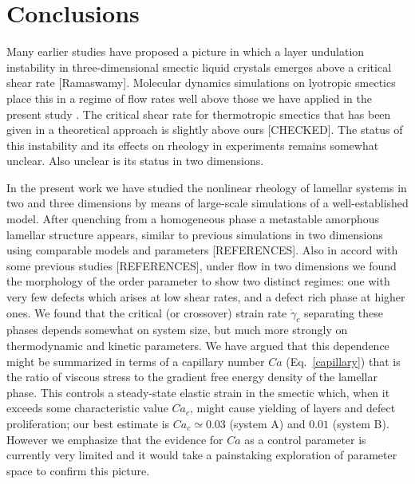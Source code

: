 \documentclass[8.5pt,twoside,twocolumn]{article}
\begin{document}
\section{Conclusions}\label{conclusions}

Many earlier studies have proposed a picture in which a layer undulation instability in three-dimensional smectic liquid crystals emerges above a critical shear rate \cite{Zilman99,Courbin02,Gonnella98,Kumaran2001} [Ramaswamy]. Molecular dynamics simulations on lyotropic smectics place this in a regime of flow rates well above those we have applied in the present study \cite{Guo2002,Soddemann2004}. The critical shear rate for thermotropic smectics that has been given in a theoretical approach \cite{Stewart2009} is slightly above ours [CHECKED]. The status of this instability and its effects on rheology in experiments remains somewhat unclear. Also unclear is its status in two dimensions.

In the present work we have studied the nonlinear rheology of lamellar systems in two and three dimensions by means of large-scale simulations of a well-established model. After quenching from a homogeneous phase a metastable amorphous lamellar structure appears, similar to previous simulations in two dimensions using comparable models and parameters [REFERENCES].
Also in accord with some previous studies [REFERENCES], under flow in two dimensions we found the morphology of the order parameter to show two distinct regimes: one with very few defects which arises at low shear rates, and a defect rich phase at higher ones. We found that the critical (or crossover) strain rate $\dot\gamma_c$ separating these phases depends somewhat on system size, but much more strongly on thermodynamic and kinetic parameters. We have argued that this dependence might be summarized in terms of a capillary number $Ca$ (Eq.~\ref{capillary}) that is the ratio of viscous stress to the gradient free energy density of the lamellar phase. This controls a steady-state elastic strain in the smectic which, when it exceeds some characteristic value $Ca_c$, might cause yielding of layers and defect proliferation; our best estimate is $Ca_c \simeq 0.03$ (system A) and $0.01$ (system B). However we emphasize that the evidence for $Ca$ as a control parameter is currently very limited and it would take a painstaking exploration of parameter space to confirm this picture. 
\end{document}
